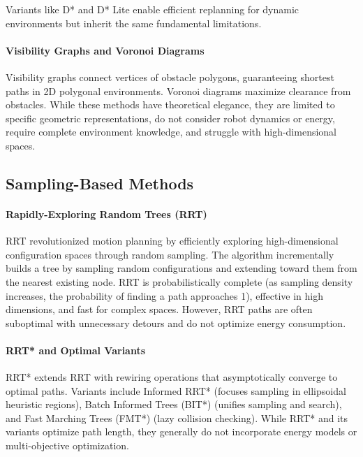 Variants like D* \cite{Stentz1995} and D* Lite \cite{Koenig2002} enable efficient replanning for dynamic environments but inherit the same fundamental limitations.

\paragraph{Visibility Graphs and Voronoi Diagrams}
Visibility graphs \cite{LozanoPerez1979} connect vertices of obstacle polygons, guaranteeing shortest paths in 2D polygonal environments. Voronoi diagrams \cite{Takahashi1989} maximize clearance from obstacles. While these methods have theoretical elegance, they are limited to specific geometric representations, do not consider robot dynamics or energy, require complete environment knowledge, and struggle with high-dimensional spaces.

\subsection{Sampling-Based Methods}

\paragraph{Rapidly-Exploring Random Trees (RRT)}
RRT \cite{LaValle2001} revolutionized motion planning by efficiently exploring high-dimensional configuration spaces through random sampling. The algorithm incrementally builds a tree by sampling random configurations and extending toward them from the nearest existing node. RRT is probabilistically complete (as sampling density increases, the probability of finding a path approaches 1), effective in high dimensions, and fast for complex spaces. However, RRT paths are often suboptimal with unnecessary detours and do not optimize energy consumption.

\paragraph{RRT* and Optimal Variants}
RRT* \cite{Karaman2011} extends RRT with rewiring operations that asymptotically converge to optimal paths. Variants include Informed RRT* \cite{Gammell2014} (focuses sampling in ellipsoidal heuristic regions), Batch Informed Trees (BIT*) \cite{Gammell2015} (unifies sampling and search), and Fast Marching Trees (FMT*) \cite{Janson2015} (lazy collision checking). While RRT* and its variants optimize path length, they generally do not incorporate energy models or multi-objective optimization.

